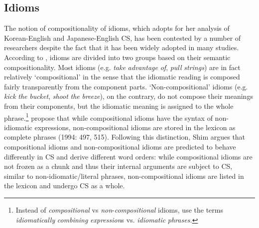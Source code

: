 \subsection{Idioms} \label{ch1:sect:Idioms}

The notion of compositionality of idioms, which \citet{Shim2011} adopts for her analysis of Korean-English and Japanese-English \ac{CS}, has been contested by a number of researchers despite the fact that it has been widely adopted in many studies. According to \citet{NunbergEtAl1994}, idioms are divided into two groups based on their semantic compositionality. Most idioms (e.g. \textit{take} \textit{advantage} \textit{of}, \textit{pull} \textit{strings}) are in fact relatively ‘compositional’ in the sense that the idiomatic reading is composed fairly transparently from the component parts. ‘Non-compositional’ idioms (e.g. \textit{kick} \textit{the} \textit{bucket}, \textit{shoot} \textit{the} \textit{breeze}), on the contrary, do not compose their meanings from their components, but the idiomatic meaning is assigned to the whole phrase.\footnote{\textrm{Instead of} \textrm{\textit{compositional}} \textrm{vs} \textrm{\textit{non}}\textrm{{}-}\textrm{\textit{compositional}} \textrm{idioms, \citet{NunbergEtAl1994} use the terms} \textrm{\textit{idiomatically} \textit{combining} \textit{expression}}\textrm{s vs.} \textrm{\textit{idiomatic} \textit{phrases.}}} \citeauthor{NunbergEtAl1994} propose that while compositional idioms have the syntax of non-idiomatic expressions, non-compositional idioms are stored in the lexicon as complete phrases (1994: 497, 515). Following this distinction, Shim argues that compositional idioms and non-compositional idioms are predicted to behave differently in \ac{CS} and derive different word orders: while compositional idioms are not frozen as a chunk and thus their internal arguments are subject to \ac{CS}, similar to non-idiomatic/literal phrases, non-compositional idioms are listed in the lexicon and undergo \ac{CS} as a whole.  

